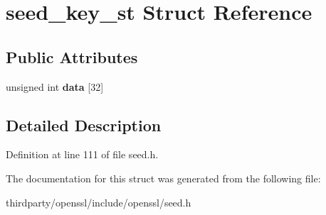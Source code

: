 \hypertarget{structseed__key__st}{}\section{seed\+\_\+key\+\_\+st Struct Reference}
\label{structseed__key__st}
\subsection*{Public Attributes}
\begin{DoxyCompactItemize}
\item 
\mbox{\label{structseed__key__st_ab9f1ccfde6c6664bd92ce73b7d3c1556}} 
unsigned int {\bfseries data} \mbox{[}32\mbox{]}
\end{DoxyCompactItemize}


\subsection{Detailed Description}


Definition at line 111 of file seed.\+h.



The documentation for this struct was generated from the following file\+:\begin{DoxyCompactItemize}
\item 
thirdparty/openssl/include/openssl/seed.\+h\end{DoxyCompactItemize}
